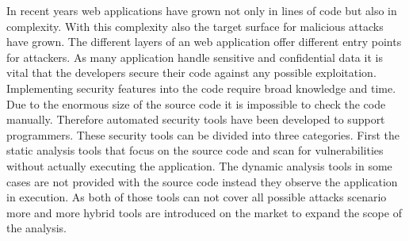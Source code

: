 In recent years web applications have grown not only in lines of code but also in complexity. With this complexity also the target surface for malicious attacks have grown. The different layers of an web application offer different entry points for attackers. As many application handle sensitive and confidential data it is vital that the developers secure their code against any possible exploitation. Implementing security features into the code require broad knowledge and time. Due to the enormous size of the source code it is impossible to check the code manually. Therefore automated security tools have been developed to support programmers. These security tools can be divided into three categories. First the static analysis tools that focus on the source code and scan for vulnerabilities without actually executing the application. The dynamic analysis tools in some cases are not provided with the source code instead they observe the application in execution. As both of those tools can not cover all possible attacks scenario more and more hybrid tools are introduced on the market to expand the scope of the analysis. 